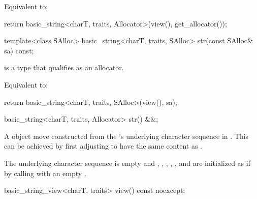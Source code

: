 \begin{itemdescr}
\pnum
\effects
Equivalent to:
\begin{codeblock}
return basic_string<charT, traits, Allocator>(view(), get_allocator());
\end{codeblock}
\end{itemdescr}

%
\begin{itemdecl}
template<class SAlloc>
  basic_string<charT, traits, SAlloc> str(const SAlloc& sa) const;
\end{itemdecl}

\begin{itemdescr}
\pnum
\constraints {} is a type that
qualifies as an allocator.

\pnum
\effects
Equivalent to:
\begin{codeblock}
return basic_string<charT, traits, SAlloc>(view(), sa);
\end{codeblock}
\end{itemdescr}

\begin{itemdecl}
basic_string<charT, traits, Allocator> str() &&;
\end{itemdecl}

\begin{itemdescr}
\pnum
\returns
A  object
move constructed from
the 's underlying character sequence in .
This can be achieved by first adjusting  to have
the same content as .

\pnum
\ensures
The underlying character sequence  is empty and
, , , ,
, and 
are initialized as if by calling 
with an empty .
\end{itemdescr}

%
\begin{itemdecl}
basic_string_view<charT, traits> view() const noexcept;
\end{itemdecl}

